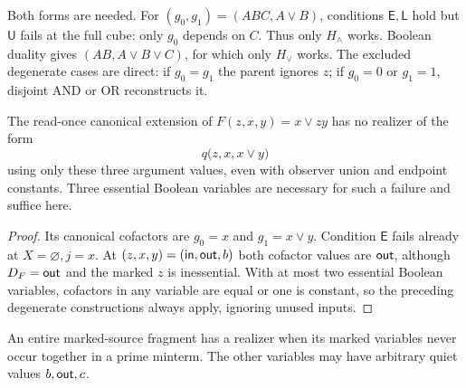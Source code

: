 Both forms are needed. For $(g_0,g_1)=(ABC,A\vee B)$, conditions
$\mathsf E,\mathsf L$ hold but $\mathsf U$ fails at the full cube:
only $g_0$ depends on $C$. Thus only $H_\wedge$ works. Boolean duality
gives $(AB,A\vee B\vee C)$, for which only $H_\vee$ works.
The excluded degenerate cases are direct: if $g_0=g_1$ the parent
ignores $z$; if $g_0=0$ or $g_1=1$, disjoint AND or OR reconstructs it.

\begin{corollary}
\label{core:cor:cofactor-gate-obstruction}
The read-once canonical extension of $F(z,x,y)=x\vee zy$ has no
realizer of the form
\[
 q\bigl(z,x,x\vee y\bigr)
\]
using only these three argument values, even with observer union and
endpoint constants. Three essential Boolean variables are necessary
for such a failure and suffice here.
\end{corollary}
\begin{proof}
Its canonical cofactors are $g_0=x$ and $g_1=x\vee y$.
Condition $\mathsf E$ fails already at $X=\varnothing,j=x$.
At $(z,x,y)=(\mathsf{in},\mathsf{out},b)$ both cofactor values are $\mathsf{out}$, although
$D_F=\mathsf{out}$ and the marked $z$ is inessential.
With at most two essential Boolean variables, cofactors in any variable
are equal or one is constant, so the preceding degenerate constructions
always apply, ignoring unused inputs.
\end{proof}

An entire marked-source fragment has a realizer when its marked variables
never occur together in a prime minterm. The other variables may have
arbitrary quiet values $b,\mathsf{out},c$.

